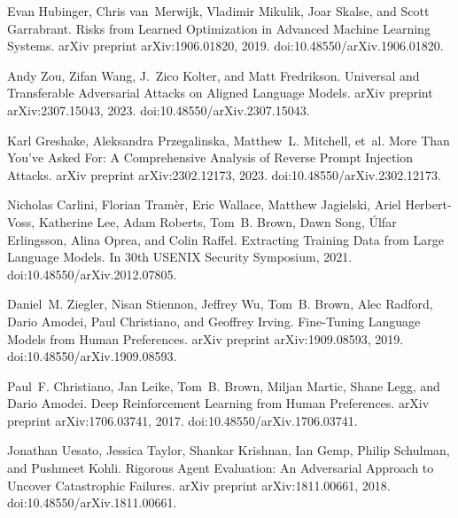 \documentclass[11pt]{article}
\begin{document}
\begin{thebibliography}{99}
Evan Hubinger, Chris van~Merwijk, Vladimir Mikulik, Joar Skalse, and Scott Garrabrant.
\newblock Risks from Learned Optimization in Advanced Machine Learning Systems.
\newblock arXiv preprint arXiv:1906.01820, 2019.
\newblock doi:10.48550/arXiv.1906.01820.

Andy Zou, Zifan Wang, J.~Zico Kolter, and Matt Fredrikson.
\newblock Universal and Transferable Adversarial Attacks on Aligned Language Models.
\newblock arXiv preprint arXiv:2307.15043, 2023.
\newblock doi:10.48550/arXiv.2307.15043.

Karl Greshake, Aleksandra Przegalinska, Matthew~L. Mitchell, et~al.
\newblock More Than You've Asked For: A Comprehensive Analysis of Reverse Prompt Injection Attacks.
\newblock arXiv preprint arXiv:2302.12173, 2023.
\newblock doi:10.48550/arXiv.2302.12173.

Nicholas Carlini, Florian Tram{\`e}r, Eric Wallace, Matthew Jagielski, Ariel Herbert-Voss, Katherine Lee, Adam Roberts, Tom~B. Brown, Dawn Song, {\'U}lfar Erlingsson, Alina Oprea, and Colin Raffel.
\newblock Extracting Training Data from Large Language Models.
\newblock In 30th USENIX Security Symposium, 2021.
\newblock doi:10.48550/arXiv.2012.07805.

Daniel~M. Ziegler, Nisan Stiennon, Jeffrey Wu, Tom~B. Brown, Alec Radford, Dario Amodei, Paul Christiano, and Geoffrey Irving.
\newblock Fine-Tuning Language Models from Human Preferences.
\newblock arXiv preprint arXiv:1909.08593, 2019.
\newblock doi:10.48550/arXiv.1909.08593.

Paul~F. Christiano, Jan Leike, Tom~B. Brown, Miljan Martic, Shane Legg, and Dario Amodei.
\newblock Deep Reinforcement Learning from Human Preferences.
\newblock arXiv preprint arXiv:1706.03741, 2017.
\newblock doi:10.48550/arXiv.1706.03741.

Jonathan Uesato, Jessica Taylor, Shankar Krishnan, Ian Gemp, Philip Schulman, and Pushmeet Kohli.
\newblock Rigorous Agent Evaluation: An Adversarial Approach to Uncover Catastrophic Failures.
\newblock arXiv preprint arXiv:1811.00661, 2018.
\newblock doi:10.48550/arXiv.1811.00661.


\end{thebibliography}
\end{document}

